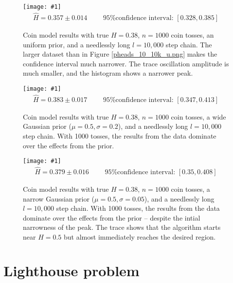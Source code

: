 \documentclass{article}
\theoremstyle{definition}
\renewcommand{\sp}[1]{\;\;\;\text{ #1 }\;\;\;}
\newcommand{\plop}[3]{
    \begin{figure}\centering
        \texttt{[image: \#1]}
        {#2}\vspace{-20pt}
        \caption{\label{#1}#3}
    \end{figure}
}
\begin{document}
\plop{pheads_1k_10k_u.png}
{\begin{align*}
\hat H = 0.357 \pm 0.014
\sp{}
\text{95\% confidence interval: }
[0.328, 0.385]
\end{align*}}
{
Coin model results with true $H = 0.38$, $n = 1000$ coin tosses, an uniform
prior, and a
needlessly long $l = 10,000$ step chain. The larger dataset
than in Figure \ref{pheads_10_10k_u.png} makes the
confidence interval much narrower. The trace oscillation amplitude
is much smaller, and the histogram shows a narrower peak.
}

\plop{pheads_1k_10k_wg.png}
{\begin{align*}
\hat H = 0.383 \pm 0.017
\sp{}
\text{95\% confidence interval: }
[0.347, 0.413]
\end{align*}}
{
Coin model results with true $H = 0.38$, $n = 1000$ coin tosses, a wide
Gaussian prior ($\mu = 0.5, \sigma = 0.2$), and a
needlessly long $l = 10,000$ step chain. With 1000 tosses, the results
from the data dominate over the effects from the prior.
}

\plop{pheads_1k_10k_ng.png}
{\begin{align*}
\hat H = 0.379 \pm 0.016
\sp{}
\text{95\% confidence interval: }
[0.35, 0.408]
\end{align*}}
{
Coin model results with true $H = 0.38$, $n = 1000$ coin tosses, a narrow
Gaussian prior ($\mu = 0.5, \sigma = 0.05$), and a
needlessly long $l = 10,000$ step chain. With 1000 tosses, the results
from the data dominate over the effects from the prior -- despite
the intial narrowness of the peak. The trace shows that the algorithm
starts near $H = 0.5$ but almost immediately reaches the desired region.
}


\newpage

\section{Lighthouse problem}
\end{document}
